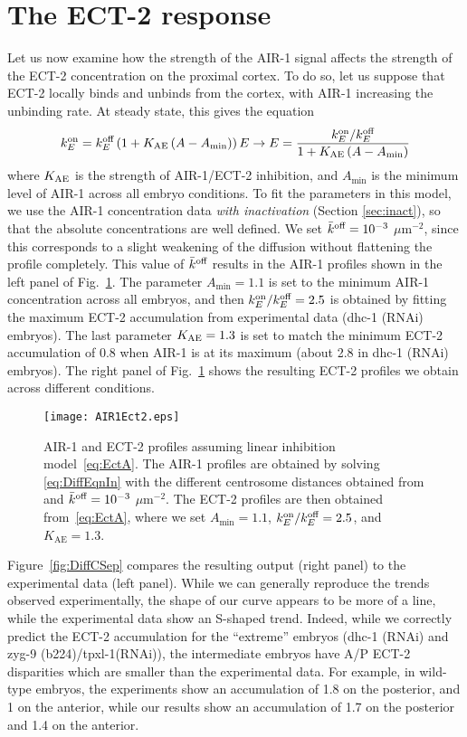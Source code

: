 \documentclass[11pt]{article}
\begin{document}
\section{The ECT-2 response}
Let us now examine how the strength of the AIR-1 signal affects the strength of the ECT-2 concentration on the proximal cortex. To do so, let us suppose that ECT-2 locally binds and unbinds from the cortex, with AIR-1 increasing the unbinding rate. At steady state, this gives the equation
\begin{equation}
\label{eq:EctA}
 k^\text{on}_E = k^\text{off}_E \left(1+K_\text{AE} \left(A-A_\text{min}\right)\right)E \rightarrow E = \frac{k^\text{on}_E/ k^\text{off}_E}{ 1+K_\text{AE} \left(A-A_\text{min}\right)}
\end{equation}
where $K_\text{AE}$ is the strength of AIR-1/ECT-2 inhibition, and $A_\text{min}$ is the minimum level of AIR-1 across all embryo conditions. To fit the parameters in this model, we use the AIR-1 concentration data \emph{with inactivation} (Section \ref{sec:inact}), so that the absolute concentrations are well defined. We set $\bar{k}^\text{off}=10^{-3}$ $\mu$m$^{-2}$, since this corresponds to a slight weakening of the diffusion without flattening the profile completely. This value of $\bar{k}^\text{off}$ results in the AIR-1 profiles shown in the left panel of Fig.\ \ref{fig:AIRECT}. The parameter $A_\text{min}=1.1$ is set to the minimum AIR-1 concentration across all embryos, and then $k^\text{on}_E/ k^\text{off}_E=2.5$ is obtained by fitting the maximum ECT-2 accumulation from experimental data (dhc-1 (RNAi) embryos). The last parameter $K_\text{AE}=1.3$ is set to match the minimum ECT-2 accumulation of 0.8 when AIR-1 is at its maximum (about 2.8 in dhc-1 (RNAi) embryos). The right panel of Fig.\ \ref{fig:AIRECT} shows the resulting ECT-2 profiles we obtain across different conditions. 

\begin{figure}
\centering
\texttt{[image: AIR1Ect2.eps]}
\caption{\label{fig:AIRECT}AIR-1 and ECT-2 profiles assuming linear inhibition model\ \eqref{eq:EctA}. The AIR-1 profiles are obtained by solving \eqref{eq:DiffEqnIn} with the different centrosome distances obtained from \cite{longhini2022aurora} and $\bar{k}^\text{off}=10^{-3}$ $\mu$m$^{-2}$. The ECT-2 profiles are then obtained from\ \eqref{eq:EctA}, where we set $A_\text{min}=1.1$, $k^\text{on}_E/k^\text{off}_E=2.5$, and $K_\text{AE}=1.3$. }
\end{figure}

Figure\ \ref{fig:DiffCSep} compares the resulting output (right panel) to the experimental data (left panel). While we can generally reproduce the trends observed experimentally, the shape of our curve appears to be more of a line, while the experimental data show an S-shaped trend. Indeed, while we correctly predict the ECT-2 accumulation for the ``extreme'' embryos (dhc-1 (RNAi) and zyg-9 (b224)/tpxl-1(RNAi)), the intermediate embryos have A/P ECT-2 disparities which are smaller than the experimental data. For example, in wild-type embryos, the experiments show an accumulation of 1.8 on the posterior, and 1 on the anterior, while our results show an accumulation of 1.7 on the posterior and 1.4 on the anterior. 
\end{document}
